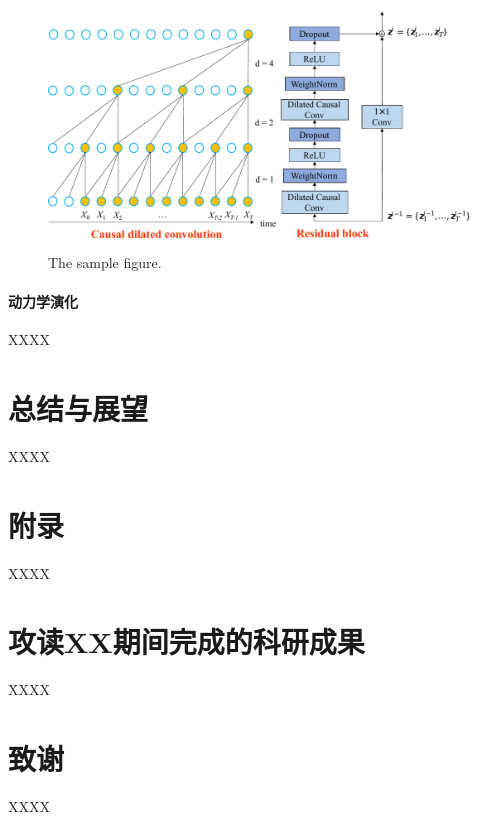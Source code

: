 \documentclass[type=doctor]{YNUthesis} %
\begin{document}
\begin{figure}[t]
\label{fig_1}
    \centering
    \includegraphics[width=\linewidth]{Fig_Sample.pdf}
    \caption{The sample figure.}
\end{figure}

\subsubsection{动力学演化}
XXXX

\chapter{总结与展望}
XXXX

\appendix
\chapter{附录}
XXXX

\backmatter

\printbibliography

\chapter{攻读XX期间完成的科研成果}
XXXX

\chapter{致谢}
XXXX
\end{document}

